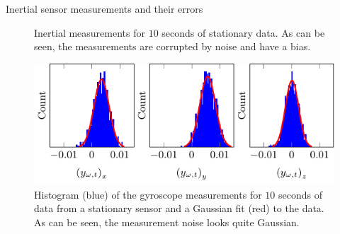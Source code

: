 \begin{myexample}{Inertial sensor measurements and their errors}
\begin{figure}
	\centering
    	\caption{Inertial measurements for $10$ seconds of stationary data. As can be seen, the measurements are corrupted by noise and have a bias.}
	\label{fig:sensors-accgyrMeas}
\end{figure}

\begin{figure}
	\centering
    	\includegraphics[scale = 1]{figure2_3.pdf}
    	\caption{Histogram (blue) of the gyroscope measurements for $10$ seconds of data from a stationary sensor and a Gaussian fit (red) to the data. As can be seen, the measurement noise looks quite Gaussian.}
	\label{fig:sensors-gyrMeasNoiseHist}
\end{figure}


\end{myexample}
